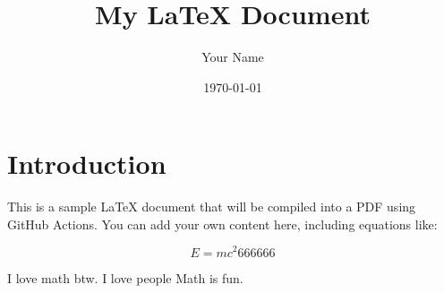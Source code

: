 \documentclass[a4paper,12pt]{article}
\begin{document}
\title{My LaTeX Document}
\author{Your Name}
\date{\today}
\maketitle

\section{Introduction}
This is a sample LaTeX document that will be compiled into a PDF using GitHub Actions. You can add your own content here, including equations like:

\begin{equation}
E = mc^2 666666
\end{equation}

I love math btw. I love people
Math is fun.
\end{document}
